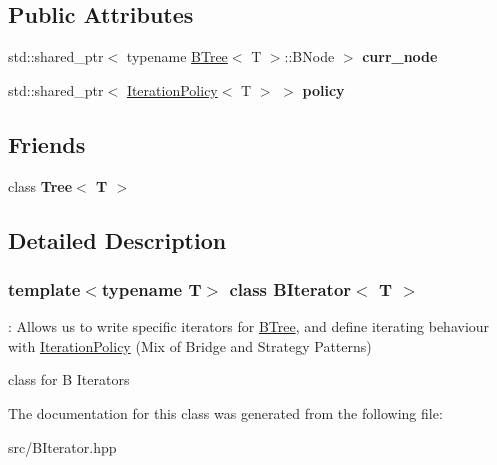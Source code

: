 \subsection*{Public Attributes}
\begin{DoxyCompactItemize}
\item 
\mbox{\label{classBIterator_abee7e8944e9f35f81cc357be10e75b8c}} 
std\+::shared\+\_\+ptr$<$ typename \hyperlink{classBTree}{B\+Tree}$<$ T $>$\+::B\+Node $>$ {\bfseries curr\+\_\+node}
\item 
\mbox{\label{classBIterator_a7b6bb4f8550c6d2ee9549e15ab09a644}} 
std\+::shared\+\_\+ptr$<$ \hyperlink{classIterationPolicy}{Iteration\+Policy}$<$ T $>$ $>$ {\bfseries policy}
\end{DoxyCompactItemize}
\subsection*{Friends}
\begin{DoxyCompactItemize}
\item 
\mbox{\label{classBIterator_a151ca71f2c751d8a163f3f99ccf6cec9}} 
class {\bfseries Tree$<$ T $>$}
\end{DoxyCompactItemize}


\subsection{Detailed Description}
\subsubsection*{template$<$typename T$>$\newline
class B\+Iterator$<$ T $>$}

\+: Allows us to write specific iterators for \hyperlink{classBTree}{B\+Tree}, and define iterating behaviour with \hyperlink{classIterationPolicy}{Iteration\+Policy} (Mix of Bridge and Strategy Patterns) 

class for B Iterators 

The documentation for this class was generated from the following file\+:\begin{DoxyCompactItemize}
\item 
src/B\+Iterator.\+hpp\end{DoxyCompactItemize}
